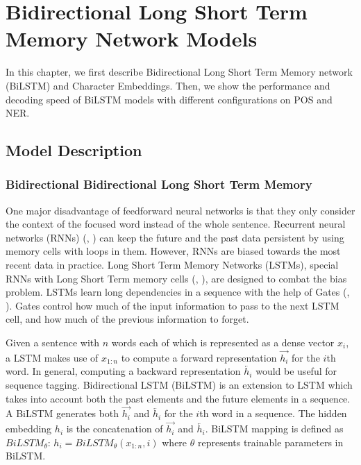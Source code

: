 \chapter{Bidirectional Long Short Term Memory Network Models}
In this chapter, we first describe Bidirectional Long Short Term Memory network (BiLSTM) and Character Embeddings. Then, we show the performance and decoding speed of BiLSTM models with different configurations on POS and NER.

\section{Model Description}
\subsection{Bidirectional Bidirectional Long Short Term Memory}

One major disadvantage of feedforward neural networks is that they only consider the context of the focused word instead of the whole sentence. Recurrent neural networks (RNNs) (\citeauthor{mikolov2010recurrent}, \citeyear{mikolov2010recurrent}) can keep the future and the past data persistent by using memory cells with loops in them. However, RNNs are biased towards the most recent data in practice. Long Short Term Memory Networks (LSTMs), special RNNs with Long Short Term memory cells  (\citeauthor{graves2005framewise}, \citeyear{graves2005framewise}), are designed to combat the bias problem. LSTMs learn long dependencies in a sequence with the help of Gates (\citeauthor{graves2005framewise}, \citeyear{graves2005framewise}). Gates control how much of the input information to pass to the next LSTM cell, and how much of the previous information to forget.

Given a sentence with $n$ words each of which is represented as a dense vector $x_i$, a LSTM makes use of $x_{1:n}$ to compute a forward representation $\overrightarrow {h_{i}}$ for the $i$th word. In general, computing a backward representation $\overleftarrow {h_{i}}$ would be useful for sequence tagging. Bidirectional LSTM (BiLSTM) is an extension to LSTM which takes into account both the past elements and the future elements in a sequence. A BiLSTM generates both $\overrightarrow {h_{i}}$ and $\overleftarrow {h_{i}}$ for the $i$th word in a sequence. The hidden embedding $h_{i}$ is the concatenation of $\overrightarrow {h_{i}}$ and $\overleftarrow {h_{i}}$. BiLSTM mapping is defined as $BiLSTM_{\theta}$:
$h_{i} = BiLSTM_{\theta}\left(x_{1:n}, i\right)$ where $\theta$ represents trainable parameters in BiLSTM.

